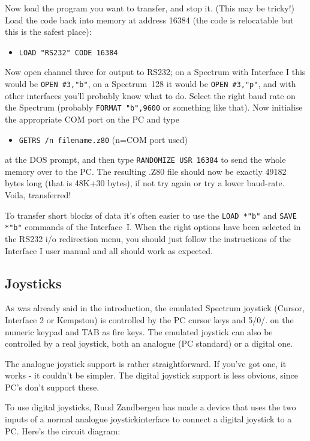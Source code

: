     Now load the program you want to transfer, and stop it.  (This may be
    tricky!)  Load the code back into memory at address 16384 (the code is
    relocatable but this is the safest place):
\begin{itemize}
  \item[] \verb|LOAD "RS232" CODE 16384|
\end{itemize}
    Now open channel three for output to RS232; on a Spectrum with Interface
    I this would be \verb|OPEN #3,"b"|, on a Spectrum~128 it would be
    \verb|OPEN #3,"p"|,
    and with other interfaces you'll probably know what to do. Select the
    right baud rate on the Spectrum (probably \verb|FORMAT "b",9600|
    or something like that).
    Now initialise the appropriate COM port on the PC and type
\begin{itemize}
  \item[] \verb|GETRS /n filename.z80|   \qquad  (n=COM port used)
\end{itemize}
    at the DOS prompt, and then type \verb|RANDOMIZE USR 16384|
    to send the whole
    memory over to the PC\@.  The resulting .Z80 file should now be exactly
    49182 bytes long (that is 48K+30 bytes), if not try again or try a lower
    baud-rate.  Voila, transferred!

    To transfer short blocks of data it's often easier to use the 
    \verb|LOAD *"b"| and \verb|SAVE *"b"|
    commands of the Interface~I.  When the right options have
    been selected in the RS232 i/o redirection menu, you should just follow
    the instructions of the Interface I user manual and all should work as
    expected.



\subsection{Joysticks}

    As was already said in the introduction, the emulated Spectrum joystick
    (Cursor, Interface 2 or Kempston) is controlled by the PC cursor keys
    and 5/0/.  on the numeric keypad and TAB as fire keys.  The emulated
    joystick can also be controlled by a real joystick, both an analogue (PC
    standard) or a digital one.

    The analogue joystick support is rather straightforward.  If you've got
    one, it works - it couldn't be simpler.  The digital joystick support is
    less obvious, since PC's don't support these.

    To use digital joysticks, Ruud Zandbergen has made a device that uses
    the two inputs of a normal analogue joystickinterface to connect a
    digital joystick to a PC\@.  Here's the circuit diagram:
\newpage

